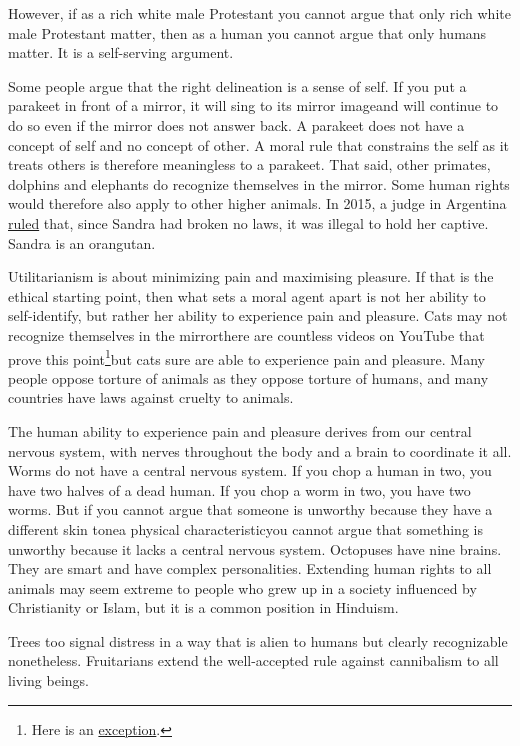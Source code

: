 However, if as a rich white male Protestant you cannot argue that only rich white male Protestant matter, then as a human you cannot argue that only humans matter. It is a self-serving argument.

Some people argue that the right delineation is a sense of self. If you put a parakeet in front of a mirror, it will sing to its mirror image\textemdash and will continue to do so even if the mirror does not answer back. A parakeet does not have a concept of self and no concept of other. A moral rule that constrains the self as it treats others is therefore meaningless to a parakeet. That said, other primates, dolphins and elephants do recognize themselves in the mirror. Some human rights would therefore also apply to other higher animals. In 2015, a judge in Argentina \href{https://edition.cnn.com/2014/12/23/world/americas/feat-orangutan-rights-ruling/}{ruled} that, since Sandra had broken no laws, it was illegal to hold her captive. Sandra is an orangutan.

Utilitarianism is about minimizing pain and maximising pleasure. If that is the ethical starting point, then what sets a moral agent apart is not her ability to self-identify, but rather her ability to experience pain and pleasure. Cats may not recognize themselves in the mirror\textemdash there are countless videos on YouTube that prove this point\footnote{Here is an \href{https://twitter.com/Pandamoanimum/status/1283753313134149633}{exception}.}\textemdash but cats sure are able to experience pain and pleasure. Many people oppose torture of animals as they oppose torture of humans, and many countries have laws against cruelty to animals.

The human ability to experience pain and pleasure derives from our central nervous system, with nerves throughout the body and a brain to coordinate it all. Worms do not have a central nervous system. If you chop a human in two, you have two halves of a dead human. If you chop a worm in two, you have two worms. But if you cannot argue that someone is unworthy because they have a different skin tone\textemdash a physical characteristic\textemdash you cannot argue that something is unworthy because it lacks a central nervous system. Octopuses have nine brains. They are smart and have complex personalities. Extending human rights to all animals may seem extreme to people who grew up in a society influenced by Christianity or Islam, but it is a common position in Hinduism.

Trees too signal distress in a way that is alien to humans but clearly recognizable nonetheless. Fruitarians extend the well-accepted rule against cannibalism to all living beings.

